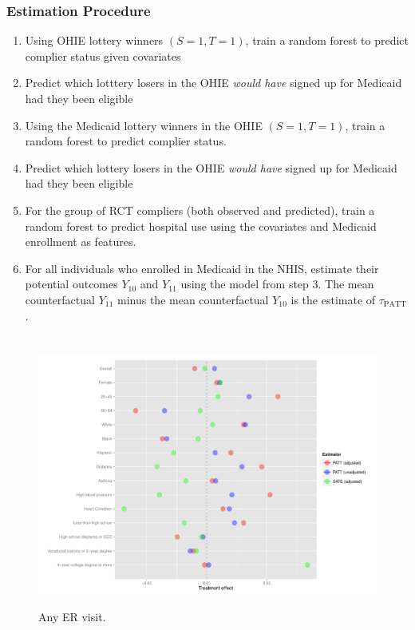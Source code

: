 \documentclass{beamer}
\begin{document}
\begin{frame} 
\frametitle{Estimation Procedure}
\begin{enumerate}
\item Using OHIE lottery winners $(S=1, T=1)$, train a random forest \citep{breiman2001} to predict complier status given covariates
\item Predict which lotttery losers in the OHIE \textit{would have} signed up for Medicaid had they been eligible
\item Using the Medicaid lottery winners in the OHIE $(S=1, T=1)$, train a random forest to predict complier status.
\item Predict which lottery losers in the OHIE \textit{would have} signed up for Medicaid had they been eligible
\item For the group of RCT compliers (both observed and predicted), train a random forest to predict hospital use using the covariates and Medicaid enrollment as features.
\item For all individuals who enrolled in Medicaid in the NHIS, estimate their potential outcomes $Y_{10}$ and $Y_{11}$ using the model from step 3.  The mean counterfactual $Y_{11}$ minus the mean counterfactual $Y_{10}$ is the estimate of $\tau_{\text{PATT}}$.
\end{enumerate}
\end{frame}



\section[Results]{}

\begin{frame}
\begin{figure}[htbp]
\begin{center}
       \caption{Any ER visit.}
   \includegraphics[scale=0.35]{../paper/any-visit-plot.pdf} 
   \label{het-plot-av}
   \end{center}
\end{figure}
\end{frame}
\end{document}
